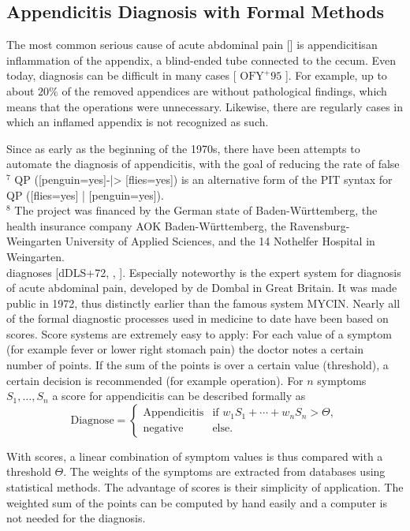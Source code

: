 \documentclass[10pt]{book}
\begin{document}
\subsection{Appendicitis Diagnosis with Formal Methods}
The most common serious cause of acute abdominal pain [\cite{dedombal1991diagnosis}] is appendicitisan inflammation of the appendix, a blind-ended tube connected to the cecum. Even today, diagnosis can be difficult in many cases [ $\mathrm{OFY}^{+} 95$ ]. For example, up to about $20 \%$ of the removed appendices are without pathological findings, which means that the operations were unnecessary. Likewise, there are regularly cases in which an inflamed appendix is not recognized as such.

Since as early as the beginning of the 1970s, there have been attempts to automate the diagnosis of appendicitis, with the goal of reducing the rate of false\\
${ }^{7}$ QP ([penguin=yes]-|> [flies=yes]) is an alternative form of the PIT syntax for QP ([flies=yes] | [penguin=yes]).\\
${ }^{8}$ The project was financed by the German state of Baden-Württemberg, the health insurance company AOK Baden-Württemberg, the Ravensburg-Weingarten University of Applied Sciences, and the 14 Nothelfer Hospital in Weingarten.\\[0pt]
diagnoses [dDLS+72, \cite{ohmann1994diagnose}, \cite{ohmann1995diagnosescore}]. Especially noteworthy is the expert system for diagnosis of acute abdominal pain, developed by de Dombal in Great Britain. It was made public in 1972, thus distinctly earlier than the famous system MYCIN.
Nearly all of the formal diagnostic processes used in medicine to date have been based on scores. Score systems are extremely easy to apply: For each value of a symptom (for example fever or lower right stomach pain) the doctor notes a certain number of points. If the sum of the points is over a certain value (threshold), a certain decision is recommended (for example operation). For $n$ symptoms $S_{1}, \ldots, S_{n}$ a score for appendicitis can be described formally as
\[
\text{Diagnose}=
\begin{cases}
\text{Appendicitis} & \text{if } w_{1} S_{1} + \cdots + w_{n} S_{n} > \Theta,\\
\text{negative} & \text{else.}
\end{cases}
\]

With scores, a linear combination of symptom values is thus compared with a threshold $\Theta$. The weights of the symptoms are extracted from databases using statistical methods. The advantage of scores is their simplicity of application. The weighted sum of the points can be computed by hand easily and a computer is not needed for the diagnosis.
\end{document}
